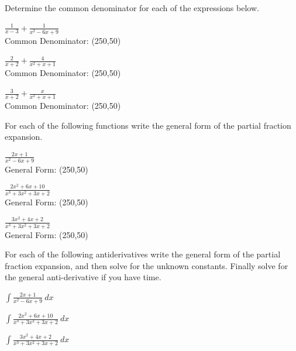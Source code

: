 \begin{problem}
\item Determine the common denominator for each of the expressions below.
  \begin{subproblem}
    \item ${\displaystyle \frac{1}{x-3} + \frac{1}{x^2-6x+9}}$ \\
      Common Denominator: \framebox(250,50){~}
      \vfill
    \item ${\displaystyle \frac{2}{x+2} + \frac{4}{x^2+x+1}}$ \\
      Common Denominator: \framebox(250,50){~}
      \vfill
    \item ${\displaystyle \frac{3}{x+2} + \frac{x}{x^2+x+1}}$ \\
      Common Denominator: \framebox(250,50){~}
      \vfill
  \end{subproblem}

  \clearpage

\item For each of the following functions write the general form of
  the partial fraction expansion.
  \begin{subproblem}
    \item ${\displaystyle \frac{2x+1}{x^2-6x+9}}$ \\
      General Form: \framebox(250,50){~}
      \vfill
    \item ${\displaystyle \frac{2x^2+6x+10}{x^3+3x^2+3x+2}}$ \\
      General Form: \framebox(250,50){~}
      \vfill
    \item ${\displaystyle \frac{3x^2+4x+2}{x^3+3x^2+3x+2}}$ \\
      General Form: \framebox(250,50){~}
      \vfill
  \end{subproblem}

\clearpage

\item For each of the following antiderivatives write the general form of
the partial fraction expansion, and then solve for the unknown constants.
Finally solve for the general anti-derivative if you have time.
\begin{subproblem}
  \item ${\displaystyle \int \frac{2x+1}{x^2-6x+9} ~ dx}$
    \vfill
  \item ${\displaystyle \int \frac{2x^2+6x+10}{x^3+3x^2+3x+2}~ dx}$
    \vfill
    \clearpage
  \item ${\displaystyle \int \frac{3x^2+4x+2}{x^3+3x^2+3x+2} ~ dx}$
    \vfill
\end{subproblem}

\end{problem}


